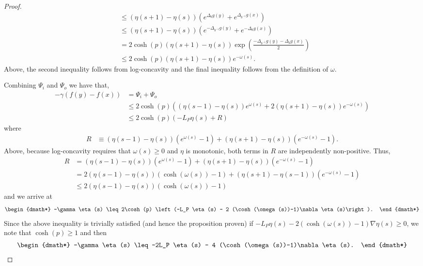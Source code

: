 \begin{proof}
\begin{align*}
	 	 &\leq \left(\eta(s+1)-\eta(s)\right)\left(e^{\Delta_b g(y)} + e^{\Delta_{b^{-1}}g(x)}\right) \\
	 	 &\leq \left(\eta(s+1)-\eta(s)\right)\left(e^{-\Delta_{b^{-1}} g(y)} + e^{-\Delta_{b}g(x)}\right) \\
	 	 &= 2 \cosh(p)\left(\eta(s+1)-\eta(s)\right)\exp\left(\frac{-\Delta_{b^{-1}} g(y)-\Delta_{b}g(x)}{2}\right) \\
	 	 &\leq 2 \cosh(p)\left(\eta(s+1)-\eta(s)\right)e^{-\omega(s)}.
	 \end{align*}
	 Above, the second inequality follows from log-concavity and the final inequality follows from the definition of $\omega$.
	 
	 Combining $\Psi_i$ and $\Psi_o$ we have that,
	 \begin{align*}
	 	-\gamma \left(f(y)-f(x)\right) &= \Psi_i + \Psi_o \\
	 	&\leq 2\cosh(p) \left( \left(\eta(s-1)-\eta(s)\right) e^{\omega(s)} + 2 \left(\eta(s+1)-\eta(s)\right)e^{-\omega(s)} \right)\\
	 	&\leq 2\cosh(p)\left(- L_P \eta(s) + R \right)
	 \end{align*} 
	 where
	 \begin{align*}
	 	R &\equiv \left(\eta(s-1)-\eta(s)\right) (e^{\omega(s)}-1) + \left(\eta(s+1)-\eta(s)\right)(e^{-\omega(s)}-1).
	 \end{align*}
	 Above, because log-concavity requires that $\omega(s)\geq 0$ and $\eta$ is monotonic, both terms in $R$ are independently non-positive. Thus, 
	 \begin{align*}
	 	R &= \left(\eta(s-1)-\eta(s)\right) (e^{\omega(s)}-1) + \left(\eta(s+1)-\eta(s)\right)(e^{-\omega(s)}-1) \\
	 	&= 2 \left(\eta(s-1)-\eta(s)\right)(\cosh(\omega(s))-1) + \left(\eta(s+1)-\eta(s-1)\right)(e^{-\omega(s)}-1) \\
	 	&\leq 2 \left(\eta(s-1)-\eta(s)\right)(\cosh(\omega(s))-1)
	 \end{align*}
	 and we arrive at 
	 \begin{dgroup*}
	 	\begin{dmath*}
	 	-\gamma \eta(s) \leq 2\cosh(p) \left(-L_P \eta(s) - 2 (\cosh(\omega(s))-1)\nabla\eta(s)\right).
	 	\end{dmath*}
	 \end{dgroup*}
	 Since the above inequality is trivially satisfied (and hence the proposition proven) if $-L_P \eta(s) - 2 (\cosh(\omega(s))-1)\nabla\eta(s) \geq 0$, we note that $\cosh(p)\geq 1$ and then 
	 \begin{dgroup*}
	 	\begin{dmath*}
	 	-\gamma \eta(s) \leq -2L_P \eta(s) - 4 (\cosh(\omega(s))-1)\nabla\eta(s).
	 	\end{dmath*}
	 \end{dgroup*}
\end{proof}	


